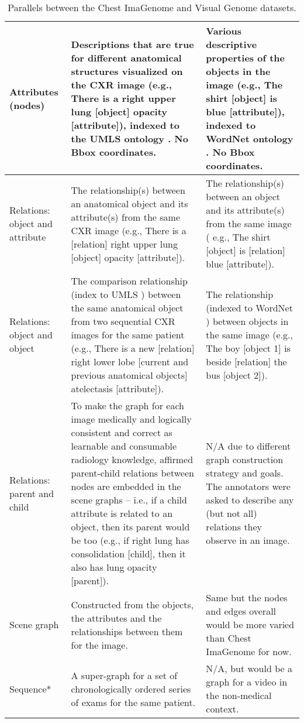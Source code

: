 \begin{table}[h!]
{\begin{tabular}{|p{4em}|p{21em}|p{16em}|}
    \midrule
    Attributes (nodes) & Descriptions that are true for different anatomical structures visualized on the CXR image (e.g., There is a right upper lung [object] opacity [attribute]), indexed to the UMLS ontology \cite{bodenreider2004unified}. No Bbox coordinates. & Various descriptive properties of the objects in the image (e.g., The shirt [object] is blue [attribute]), indexed to WordNet ontology \cite{miller1995wordnet}. No Bbox coordinates. \\
    \midrule
    Relations: object and attribute & The relationship(s) between an anatomical object and its attribute(s) from the same CXR image (e.g., There is a [relation] right upper lung [object] opacity [attribute]). & The relationship(s)  between an object and its attribute(s) from the same image ( e.g., The shirt [object] is [relation] blue [attribute]). \\
    \midrule
    Relations: object and object & The comparison relationship (index to UMLS \cite{bodenreider2004unified}) between the same anatomical object from two sequential CXR images for the same patient (e.g., There is a new [relation] right lower lobe [current and previous anatomical objects] atelectasis [attribute]). & The relationship (indexed to WordNet \cite{miller1995wordnet}) between objects in the same image (e.g., The boy [object 1] is beside [relation] the bus [object 2]). \\
    \midrule
    Relations: parent and child & To make the graph for each image medically and logically consistent and correct as learnable and consumable radiology knowledge, affirmed parent-child relations between nodes are embedded in the scene graphs -- i.e., if a child attribute is related to an object, then its parent would be too (e.g., if right lung has consolidation [child], then it also has lung opacity [parent]). & N/A due to different graph construction strategy and goals. The annotators were asked to describe any (but not all) relations they observe in an image. \\
    \midrule
    Scene graph & Constructed from the objects, the attributes and the relationships between them for the image. & Same but the nodes and edges overall would be more varied than Chest ImaGenome for now. \\
    \midrule
    Sequence* & A super-graph for a set of chronologically ordered series of exams for the same patient. & N/A, but would be a graph for a video in the non-medical context. \\
    \bottomrule
    \end{tabular}%
    }
  \caption{\label{tab:cg_vg_parallels} Parallels between the Chest ImaGenome and Visual Genome datasets.}
\end{table}%

